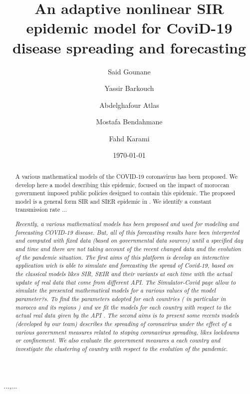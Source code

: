 \documentclass[final,a4paper,reqno]{elsarticle}
\numberwithin{equation}{section}
\begin{document}
\begin{frontmatter}
\title{ An adaptive nonlinear SIR  epidemic model for  CoviD-19 disease spreading  and forecasting }

\author[2]{ Said Gounane  }
\author[2]{Yassir Barkouch }
\author[3]{Abdelghafour Atlas }
%
\author[1]{Mostafa Bendahmane}

\author[2]{Fahd Karami}

%
\address[1]{Institut de math\'ematique de Bordeaux (IMB) et l'institue de rythmologie et mod\'elisation cardiaque (Liryc), universit\'e de Bordeaux et INRIA-Carmen Bordeaux Sud-Ouest}
\address[2]{Ecole Supérieure de Technologie d'Essaouira Km 9, Route d'Agadir, Essaouira Aljadida BP. 383, Essaouira. Maroc.}
\address[3]{Ecole Nationale des sciences appliqu\'ess ....Marrakech. Maroc.}


\begin{abstract}
A various  mathematical models of the COVID-19 coronavirus has been proposed. We develop here a model describing this epidemic,
focused on the  impact of moroccan government imposed public policies designed to contain this
epidemic. The proposed model  is a general form  SIR and SIER epidemic in \cite{KeMc}. We identify a constant transmission rate ...

\textit{ Recently, a various mathematical models has been proposed and used for modeling and forecasting COVID-19 disease. But, all of this forecasting results have been interpreted and computed with fixed data (based on governmental data sources)  until a specified day and time and there are not taking account of the recent changed data and the evolution  of the pandemie situation. The first aims of this platform is develop an interactive application wich is  able to simulate and forecasting the spread of Covid-19, based on the classical models likes SIR, SEIR and their variants at each time with the actual update of real data that  come from different API. The Simulator-Covid  page allow to simulate the presented mathematical models for a various values of the model parameter?s. To find the parameters adopted for each countries ( in particular in morocco and its regions ) and we fit the models for each country with respect to the actual real data given by the API . The second aims is to present  some recents models (developed by our team) describes the spreading of coronavirus under the effect of a various government measures related to stoping coronavirus spreading, likes lockdowns or confinement. We also evaluate the  government measures a each country and  investigate the clustering of  country with respect to the evolution of the pandemic. }
\end{abstract}

\begin{keyword} ...\sep ...
\end{keyword}
\date{\today}
\end{frontmatter}
\end{document}
